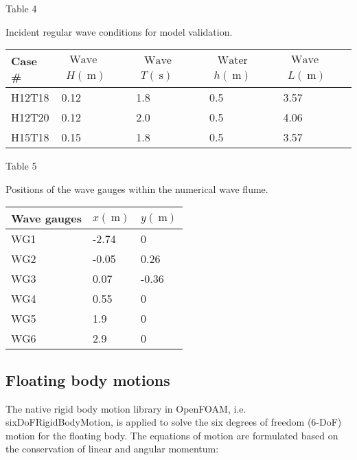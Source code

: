 Table 4

Incident regular wave conditions for model validation.

\begin{tabular}{lllll}
\hline Case \# & $\begin{array}{l}\text { Wave height } \\
H(\mathrm{~m})\end{array}$ & $\begin{array}{l}\text { Wave period } \\
T(\mathrm{~s})\end{array}$ & $\begin{array}{l}\text { Water depth } \\
h(\mathrm{~m})\end{array}$ & $\begin{array}{l}\text { Wave length } \\
L(\mathrm{~m})\end{array}$ \\
\hline H12T18 & 0.12 & 1.8 & 0.5 & 3.57 \\
H12T20 & 0.12 & 2.0 & 0.5 & 4.06 \\
H15T18 & 0.15 & 1.8 & 0.5 & 3.57 \\
\hline
\end{tabular}

Table 5

Positions of the wave gauges within the numerical wave flume.

\begin{tabular}{lll}
\hline Wave gauges & $x(\mathrm{~m})$ & $y(\mathrm{~m})$ \\
\hline WG1 & -2.74 & 0 \\
WG2 & -0.05 & 0.26 \\
WG3 & 0.07 & -0.36 \\
WG4 & 0.55 & 0 \\
WG5 & 1.9 & 0 \\
WG6 & 2.9 & 0 \\
\hline
\end{tabular}

\subsection{Floating body motions}

The native rigid body motion library in OpenFOAM, i.e. sixDoFRigidBodyMotion, is applied to solve the six degrees of freedom (6-DoF) motion for the floating body. The equations of motion are formulated based on the conservation of linear and angular momentum:

